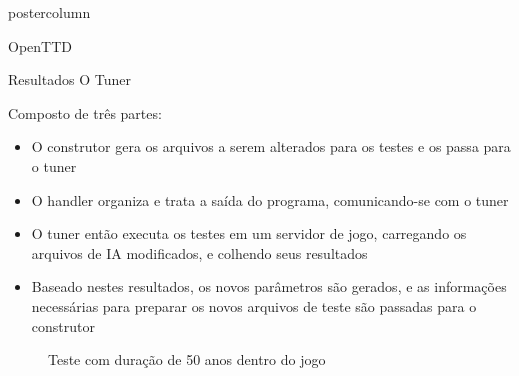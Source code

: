 \documentclass[final]{beamer}
\begin{document}
\begin{frame}
\begin{columns}
\begin{column}{.5\textwidth}
\begin{beamercolorbox}[center,wd=\textwidth]{postercolumn}
\begin{minipage}[T]{.95\textwidth}
{\begin{block}{OpenTTD}
                \vspace*{0.2cm} 
            \end{block}

            \vspace*{0.2cm} 
            
            \begin{block}{Resultados}
              \justifying 
                O Tuner
                
                \vspace*{0.2cm} 
                
                Composto de três partes:
                \begin{itemize}
                	\item O construtor gera os arquivos a serem alterados para os testes e os passa para o tuner
                	\item O handler organiza e trata a saída do programa, comunicando-se com o tuner
                	\item O tuner então executa os testes em um servidor de jogo, carregando os arquivos de IA modificados, e colhendo seus resultados
                	\item Baseado nestes resultados, os novos parâmetros são gerados, e as informações necessárias para preparar os novos arquivos de teste são passadas para o construtor
                \end{itemize}
                
                \begin{figure}[htp]
                  \centering
                  \caption{Teste com duração de 50 anos dentro do jogo}
                \end{figure}
                
                \vspace*{0.4cm}
                

\end{block}}
\end{minipage}
\end{beamercolorbox}
\end{column}
\end{columns}
\end{frame}
\end{document}
